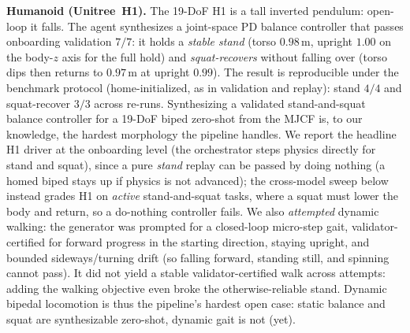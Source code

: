 \noindent\textbf{Humanoid (Unitree~H1).} The 19-DoF H1 is a tall inverted
pendulum: open-loop it falls. The agent synthesizes a joint-space PD balance
controller that passes onboarding validation $7/7$: it holds a \emph{stable
stand} (torso $0.98$\,m, upright $1.00$ on the body-$z$ axis for the full
hold) and \emph{squat-recovers} without falling over (torso dips then returns to
$0.97$\,m at upright $0.99$). The result is reproducible under the benchmark
protocol (home-initialized, as in validation and replay): stand $4/4$ and
squat-recover $3/3$ across re-runs. Synthesizing a validated stand-and-squat
balance controller for a 19-DoF biped zero-shot from the MJCF is, to our
knowledge, the hardest morphology the pipeline handles. We report the headline H1 driver at the
onboarding level (the orchestrator steps physics directly for stand
and squat), since a pure \emph{stand} replay can be passed by doing
nothing (a homed biped stays up if physics is not advanced); the
cross-model sweep below instead grades H1 on \emph{active}
stand-and-squat tasks, where a squat must lower the body and return,
so a do-nothing controller fails. We also \emph{attempted} dynamic walking:
the generator was prompted for a closed-loop micro-step gait, validator-certified
for forward progress in the starting direction, staying upright, and
bounded sideways/turning drift (so falling forward, standing still, and spinning cannot pass).
It did not yield a stable validator-certified walk across attempts: adding the
walking objective even broke the otherwise-reliable stand. Dynamic
bipedal locomotion is thus the pipeline's hardest open case:
static balance and
squat are synthesizable zero-shot, dynamic gait is not (yet).


